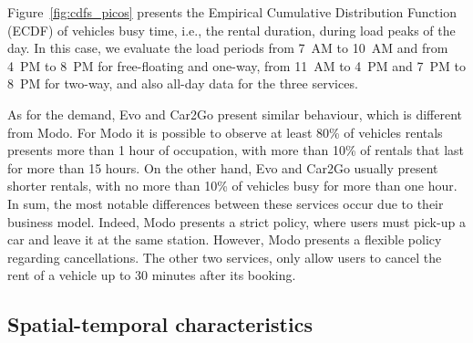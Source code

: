 Figure~\ref{fig:cdfs_picos} presents the Empirical Cumulative Distribution Function (ECDF) of vehicles busy time, i.e., the rental duration, during load peaks of the day. In this case, we evaluate the load periods from 7~AM to 10~AM and from 4~PM to 8~PM for free-floating and one-way, from 11~AM to 4~PM and 7~PM to 8~PM for two-way, and also all-day data for the three services. 

As for the demand, Evo and Car2Go present similar behaviour, which is different from Modo. For Modo it is possible to observe at least 80\% of vehicles rentals presents more than 1 hour of occupation, with more than 10\% of rentals that last for more than 15 hours. On the other hand, Evo and Car2Go usually present shorter rentals, with no more than 10\% of vehicles busy for more than one hour. 
In sum, the most notable differences between these services occur due to their business model. Indeed, Modo presents a strict policy, where users must pick-up a car and leave it at the same station. However, Modo presents a flexible policy regarding cancellations. The other two services, only allow users to cancel the rent of a vehicle up to 30 minutes after its booking.


\subsection{Spatial-temporal characteristics}
\label{sec:spatial-temporal}


